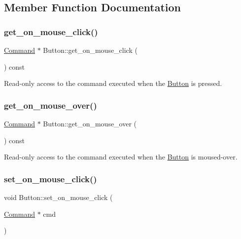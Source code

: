 \subsection{Member Function Documentation}
\mbox{\label{class_button_ac2a5c2151dc48940ac2e9c5f07c8dd6a}} 
\subsubsection{\texorpdfstring{get\+\_\+on\+\_\+mouse\+\_\+click()}{get\_on\_mouse\_click()}}
{\footnotesize\ttfamily \mbox{\hyperlink{class_command}{Command}} $\ast$ Button\+::get\+\_\+on\+\_\+mouse\+\_\+click (\begin{DoxyParamCaption}{ }\end{DoxyParamCaption}) const}

Read-\/only access to the command executed when the \mbox{\hyperlink{class_button}{Button}} is pressed. \mbox{\label{class_button_a3f9b964049bde58b8f39170ce8b6fa2e}} 
\subsubsection{\texorpdfstring{get\+\_\+on\+\_\+mouse\+\_\+over()}{get\_on\_mouse\_over()}}
{\footnotesize\ttfamily \mbox{\hyperlink{class_command}{Command}} $\ast$ Button\+::get\+\_\+on\+\_\+mouse\+\_\+over (\begin{DoxyParamCaption}{ }\end{DoxyParamCaption}) const}

Read-\/only access to the command executed when the \mbox{\hyperlink{class_button}{Button}} is moused-\/over. \mbox{\label{class_button_a7b60123b8609254c811e3c3cc9d50d07}} 
\subsubsection{\texorpdfstring{set\+\_\+on\+\_\+mouse\+\_\+click()}{set\_on\_mouse\_click()}}
{\footnotesize\ttfamily void Button\+::set\+\_\+on\+\_\+mouse\+\_\+click (\begin{DoxyParamCaption}\item[{\mbox{\hyperlink{class_command}{Command}} $\ast$}]{cmd }\end{DoxyParamCaption})}

